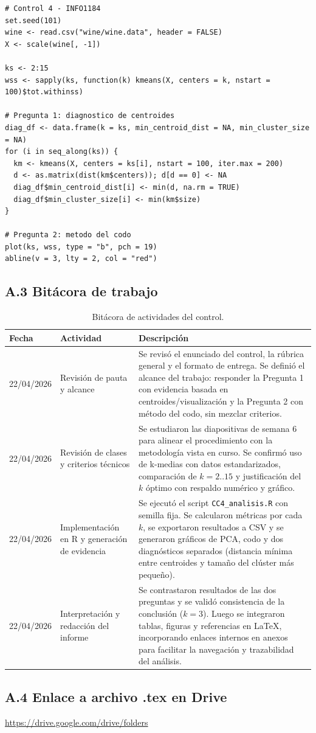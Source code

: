 \documentclass[10pt,a4paper]{article}
\begin{document}
\begin{lstlisting}
# Control 4 - INFO1184
set.seed(101)
wine <- read.csv("wine/wine.data", header = FALSE)
X <- scale(wine[, -1])

ks <- 2:15
wss <- sapply(ks, function(k) kmeans(X, centers = k, nstart = 100)$tot.withinss)

# Pregunta 1: diagnostico de centroides
diag_df <- data.frame(k = ks, min_centroid_dist = NA, min_cluster_size = NA)
for (i in seq_along(ks)) {
  km <- kmeans(X, centers = ks[i], nstart = 100, iter.max = 200)
  d <- as.matrix(dist(km$centers)); d[d == 0] <- NA
  diag_df$min_centroid_dist[i] <- min(d, na.rm = TRUE)
  diag_df$min_cluster_size[i] <- min(km$size)
}

# Pregunta 2: metodo del codo
plot(ks, wss, type = "b", pch = 19)
abline(v = 3, lty = 2, col = "red")
\end{lstlisting}

\subsection*{A.3 Bitácora de trabajo}
\label{anx:bitacora}

\begin{table}[H]
\centering
\footnotesize
\begin{tabular}{p{2.3cm} p{3.3cm} p{8.6cm}}
\toprule
Fecha & Actividad & Descripción \\
\midrule
22/04/2026 & Revisión de pauta y alcance & Se revisó el enunciado del control, la rúbrica general y el formato de entrega. Se definió el alcance del trabajo: responder la Pregunta 1 con evidencia basada en centroides/visualización y la Pregunta 2 con método del codo, sin mezclar criterios. \\
22/04/2026 & Revisión de clases y criterios técnicos & Se estudiaron las diapositivas de semana 6 para alinear el procedimiento con la metodología vista en curso. Se confirmó uso de k-medias con datos estandarizados, comparación de $k=2..15$ y justificación del $k$ óptimo con respaldo numérico y gráfico. \\
22/04/2026 & Implementación en R y generación de evidencia & Se ejecutó el script \texttt{CC4\_analisis.R} con semilla fija. Se calcularon métricas por cada $k$, se exportaron resultados a CSV y se generaron gráficos de PCA, codo y dos diagnósticos separados (distancia mínima entre centroides y tamaño del clúster más pequeño). \\
22/04/2026 & Interpretación y redacción del informe & Se contrastaron resultados de las dos preguntas y se validó consistencia de la conclusión ($k=3$). Luego se integraron tablas, figuras y referencias en \LaTeX{}, incorporando enlaces internos en anexos para facilitar la navegación y trazabilidad del análisis. \\
\bottomrule
\end{tabular}
\caption{Bitácora de actividades del control.}
\end{table}

\subsection*{A.4 Enlace a archivo .tex en Drive}
\label{anx:drive}
\href{https://drive.google.com/drive/folders/1XtYOXQIjELCpYi6g4Dtj3X43rOUEWrc1?usp=drive_link}{https://drive.google.com/drive/folders}
\end{document}

